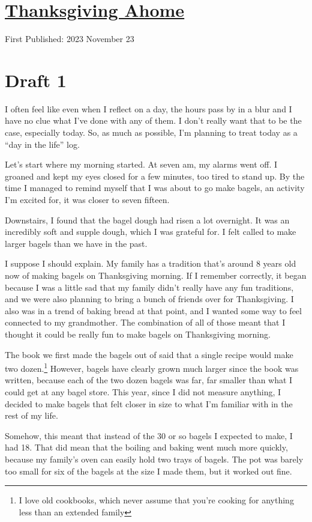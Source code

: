\documentclass[12pt]{article}[titlepage]
\newcommand{\say}[1]{``#1''}
\newcommand{\1}{\={a}}
\newcommand{\2}{\={e}}
\newcommand{\3}{\={\i}}
\newcommand{\4}{\=o}
\newcommand{\5}{\=u}
\newcommand{\6}{\={A}}
\renewcommand{\,}{\textsuperscript{,}}
\begin{document}
\doublespacing
\section{\href{thanksgiving-2023.html}{Thanksgiving Ahome}}
First Published: 2023 November 23
\section{Draft 1}
I often feel like even when I reflect on a day, the hours pass by in a blur and I have no clue what I've done with any of them.
I don't really want that to be the case, especially today.
So, as much as possible, I'm planning to treat today as a \say{day in the life} log.

Let's start where my morning started.
At seven am, my alarms went off.
I groaned and kept my eyes closed for a few minutes, too tired to stand up.
By the time I managed to remind myself that I was about to go make bagels, an activity I'm excited for, it was closer to seven fifteen.

Downstairs, I found that the bagel dough had risen a lot overnight.
It was an incredibly soft and supple dough, which I was grateful for.
I felt called to make larger bagels than we have in the past.

I suppose I should explain.
My family has a tradition that's around 8 years old now of making bagels on Thanksgiving morning.
If I remember correctly, it began because I was a little sad that my family didn't really have any fun traditions, and we were also planning to bring a bunch of friends over for Thanksgiving.
I also was in a trend of baking bread at that point, and I wanted some way to feel connected to my grandmother.
The combination of all of those meant that I thought it could be really fun to make bagels on Thanksgiving morning.

The book we first made the bagels out of said that a single recipe would make two dozen.\footnote{I love old cookbooks, which never assume that you're cooking for anything less than an extended family}
However, bagels have clearly grown much larger since the book was written, because each of the two dozen bagels was far, far smaller than what I could get at any bagel store.
This year, since I did not measure anything, I decided to make bagels that felt closer in size to what I'm familiar with in the rest of my life.

Somehow, this meant that instead of the 30 or so bagels I expected to make, I had 18.
That did mean that the boiling and baking went much more quickly, because my family's oven can easily hold two trays of bagels.
The pot was barely too small for six of the bagels at the size I made them, but it worked out fine.
\end{document}
